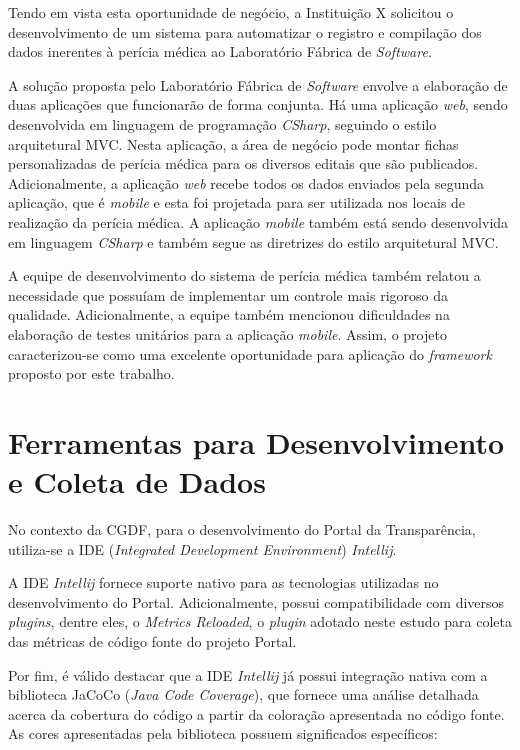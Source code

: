 Tendo em vista esta oportunidade de negócio, a Instituição X solicitou o desenvolvimento de um sistema para automatizar o registro e compilação dos dados inerentes à perícia médica ao Laboratório Fábrica de \textit{Software}.

A solução proposta pelo Laboratório Fábrica de \textit{Software} envolve a elaboração de duas aplicações que funcionarão de forma conjunta. Há uma aplicação \textit{web}, sendo desenvolvida em linguagem de programação \textit{CSharp}, seguindo o estilo arquitetural MVC. Nesta aplicação, a área de negócio pode montar fichas personalizadas de perícia médica para os diversos editais que são publicados. Adicionalmente, a aplicação \textit{web} recebe todos os dados enviados pela segunda aplicação, que é \textit{mobile} e esta foi projetada para ser utilizada nos locais de realização da perícia médica. A aplicação \textit{mobile} também está sendo desenvolvida em linguagem \textit{CSharp} e também segue as diretrizes do estilo arquitetural MVC.

A equipe de desenvolvimento do sistema de perícia médica também relatou a necessidade que possuíam de implementar um controle mais rigoroso da qualidade. Adicionalmente, a equipe também mencionou dificuldades na elaboração de testes unitários para a aplicação \textit{mobile}. Assim, o projeto caracterizou-se como uma excelente oportunidade para aplicação do \textit{framework} proposto por este trabalho.

\section{Ferramentas para Desenvolvimento e Coleta de Dados}

No contexto da CGDF, para o desenvolvimento do Portal da Transparência, utiliza-se a IDE (\textit{Integrated Development Environment}) \textit{Intellij}.

A IDE \textit{Intellij} fornece suporte nativo para as tecnologias utilizadas no desenvolvimento do Portal. Adicionalmente, possui compatibilidade com diversos \textit{plugins}, dentre eles, o \textit{Metrics Reloaded}, o \textit{plugin} adotado neste estudo para coleta das métricas de código fonte do projeto Portal.

Por fim, é válido destacar que a IDE \textit{Intellij} já possui integração nativa com a biblioteca JaCoCo (\textit{Java Code Coverage}), que fornece uma análise detalhada acerca da cobertura do código a partir da coloração apresentada no código fonte. As cores apresentadas pela biblioteca possuem significados específicos:

